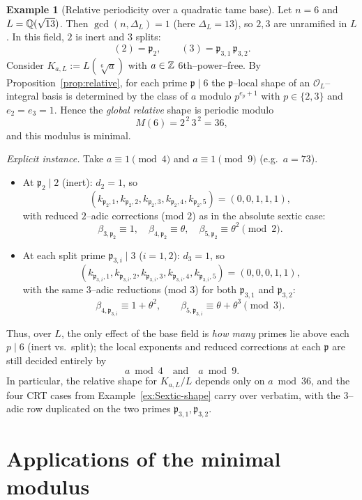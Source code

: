 \documentclass[12pt,a4paper,oneside]{amsart}
\theoremstyle{definition}
\newtheorem{example}[theorem]{Example}
\begin{document}
\begin{example}[Relative periodicity over a quadratic tame base]\label{ex:relative-sextic}
Let $n=6$ and $L=\Bbb Q(\sqrt{13})$. Then $\gcd(n,\Delta_L)=1$ (here $\Delta_L=13$), so $2,3$ are unramified in $L$. In this field, $2$ is inert and $3$ splits:
\[
(2)=\mathfrak p_2,\qquad (3)=\mathfrak p_{3,1}\,\mathfrak p_{3,2}.
\]
Consider $K_{a,L}:=L(\sqrt[6]{a})$ with $a\in\Bbb Z$ $6$th–power–free. By Proposition~\ref{prop:relative}, for each prime $\mathfrak p\mid 6$ the $\mathfrak p$–local shape of an $\mathcal O_L$–integral basis is determined by the class of $a$ modulo $p^{e_p+1}$ with $p\in\{2,3\}$ and $e_2=e_3=1$. Hence the \emph{global relative} shape is periodic modulo
\[
M(6)=2^{\,2}\,3^{\,2}=36,
\]
and this modulus is minimal.

\smallskip
\noindent\emph{Explicit instance.} Take $a\equiv 1\pmod 4$ and $a\equiv 1\pmod 9$ (e.g.\ $a=73$).
\begin{itemize}
\item At $\mathfrak p_2\mid 2$ (inert): $d_2=1$, so
\[
(k_{\mathfrak p_2,1},k_{\mathfrak p_2,2},k_{\mathfrak p_2,3},k_{\mathfrak p_2,4},k_{\mathfrak p_2,5})=(0,0,1,1,1),
\]
with reduced $2$–adic corrections (mod $2$) as in the absolute sextic case:
\[
\beta_{3,\mathfrak p_2}\equiv 1,\quad \beta_{4,\mathfrak p_2}\equiv \theta,\quad
\beta_{5,\mathfrak p_2}\equiv \theta^2\pmod{2}.
\]
\item At each split prime $\mathfrak p_{3,i}\mid 3$ ($i=1,2$): $d_3=1$, so
\[
(k_{\mathfrak p_{3,i},1},k_{\mathfrak p_{3,i},2},k_{\mathfrak p_{3,i},3},k_{\mathfrak p_{3,i},4},k_{\mathfrak p_{3,i},5})=(0,0,0,1,1),
\]
with the same $3$–adic reductions (mod $3$) for both $\mathfrak p_{3,1}$ and $\mathfrak p_{3,2}$:
\[
\beta_{4,\mathfrak p_{3,i}}\equiv 1+\theta^2,\qquad
\beta_{5,\mathfrak p_{3,i}}\equiv \theta+\theta^3\pmod{3}.
\]
\end{itemize}
Thus, over $L$, the only effect of the base field is \emph{how many} primes lie above each $p\mid 6$
(inert vs.\ split); the local exponents and reduced corrections at each $\mathfrak p$ are still decided entirely by
\[
a\bmod 4\quad\text{and}\quad a\bmod 9.
\]
In particular, the relative shape for $K_{a,L}/L$ depends only on $a\bmod 36$, and the four CRT cases from Example~\ref{ex:Sextic-shape} carry over verbatim, with the $3$–adic row duplicated on the two primes $\mathfrak p_{3,1},\mathfrak p_{3,2}$.
\end{example}


\section{Applications of the minimal modulus}\label{sec:applications}
\end{document}
